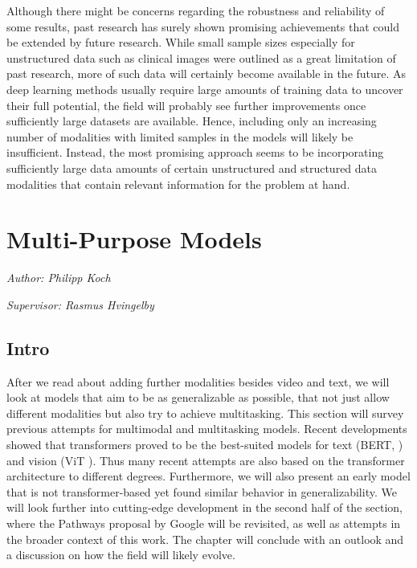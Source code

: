 \documentclass[
]{krantz}
\begin{document}
Although there might be concerns regarding the robustness and reliability of some results, past research has surely shown promising achievements that could be extended by future research. While small sample sizes especially for unstructured data such as clinical images were outlined as a great limitation of past research, more of such data will certainly become available in the future. As deep learning methods usually require large amounts of training data to uncover their full potential, the field will probably see further improvements once sufficiently large datasets are available. Hence, including only an increasing number of modalities with limited samples in the models will likely be insufficient. Instead, the most promising approach seems to be incorporating sufficiently large data amounts of certain unstructured and structured data modalities that contain relevant information for the problem at hand.

\hypertarget{c03-03-multi-purpose}{%
\section{Multi-Purpose Models}\label{c03-03-multi-purpose}}

\emph{Author: Philipp Koch}

\emph{Supervisor: Rasmus Hvingelby}

\hypertarget{intro-2}{%
\subsection{Intro}\label{intro-2}}

After we read about adding further modalities besides video and text, we will look at models that aim to be as generalizable as possible, that not
just allow different modalities but also try to achieve multitasking. This section will survey previous attempts for multimodal and multitasking models.
Recent developments showed that transformers \citep{vaswani2017attention} proved to be the best-suited models for text (BERT, \citet{Devlin2018}) and vision (ViT \citet{dosovitskiy2020image}). Thus many recent attempts are also based on the transformer architecture to different degrees. Furthermore, we will also present an early model that is not transformer-based yet found similar behavior in generalizability.
We will look further into cutting-edge development in the second half of the section, where the Pathways proposal by Google \citep{Dean21} will be revisited, as well as attempts in the broader context of this work. The chapter will conclude with an outlook and a discussion on how the field will likely evolve.
\end{document}
